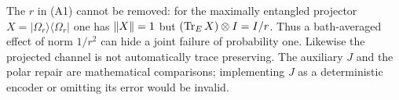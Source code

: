 The $r$ in (A1) cannot be removed: for the maximally entangled projector
$X=|\Omega_r\rangle\langle\Omega_r|$ one has $\lVert X\rVert=1$ but
$(\operatorname{Tr}_E X)\otimes I=I/r$. Thus a bath-averaged effect of norm $1/r^2$ can
hide a joint failure of probability one. Likewise the projected channel is
not automatically trace preserving. The auxiliary $J$ and the polar repair
are mathematical comparisons; implementing $J$ as a deterministic encoder
or omitting its error would be invalid.
